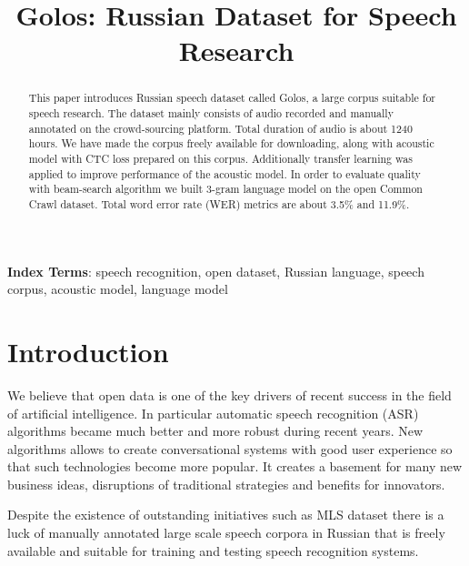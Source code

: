 \documentclass[a4paper]{article}
\title{Golos: Russian Dataset for Speech Research}
\begin{document}
\maketitle
% 
\begin{abstract}
 
This paper introduces Russian speech dataset called Golos, a large corpus suitable for speech research. The dataset mainly consists of audio recorded and manually annotated on the crowd-sourcing platform. Total duration of audio is about 1240 hours. We have made the corpus freely available for downloading, along with acoustic model with CTC loss prepared on this corpus. Additionally transfer learning was applied to improve performance of the acoustic model. In order to evaluate quality with beam-search algorithm we built 3-gram language model on the open Common Crawl dataset. Total word error rate (WER) metrics are about 3.5\% and 11.9\%.


\end{abstract}
\noindent\textbf{Index Terms}: speech recognition, open dataset, Russian language, speech corpus, acoustic model, language model

\section{Introduction}
 We believe that open data is one of the key drivers of recent success in the field of artificial intelligence. In particular automatic speech recognition (ASR) algorithms became much better and more robust during recent years. New algorithms allows to create conversational systems with good user experience so that such technologies become more popular. It creates a basement for many new business ideas, disruptions of traditional strategies and benefits for innovators. 
  
 Despite the existence of outstanding initiatives such as MLS dataset \cite{pratap2020mls} there is a luck of manually annotated large scale speech corpora in Russian that is freely available and suitable for training and testing speech recognition systems.
 
\end{document}
